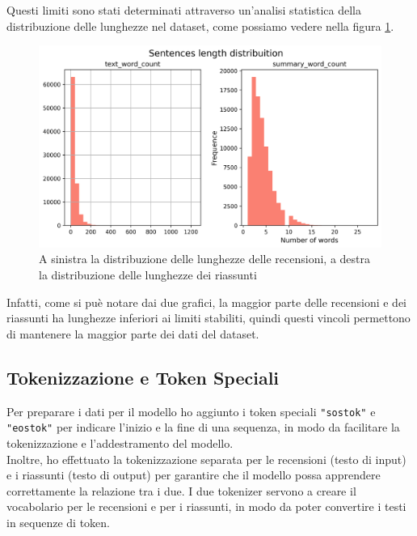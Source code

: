 Questi limiti sono stati determinati attraverso un'analisi statistica della distribuzione delle lunghezze nel dataset, come possiamo vedere nella figura \ref{fig:dataset_length_distribuition}.
\begin{figure}[H]
    \centering
    \includegraphics[width=1\textwidth]{media/dataset_length_distribuition.png}
    \caption{A sinistra la distribuzione delle lunghezze delle recensioni, a destra la distribuzione delle lunghezze dei riassunti}
    \label{fig:dataset_length_distribuition}
\end{figure}
Infatti, come si puè notare dai due grafici, la maggior parte delle recensioni e dei riassunti ha lunghezze inferiori ai limiti stabiliti, quindi questi vincoli permettono di mantenere la maggior parte dei dati del dataset.

\subsection{Tokenizzazione e Token Speciali}
Per preparare i dati per il modello ho aggiunto i token speciali \texttt{"sostok"} e \texttt{"eostok"} per indicare l'inizio e la fine di una sequenza, in modo da facilitare la tokenizzazione e l'addestramento del modello.\\
Inoltre, ho effettuato la tokenizzazione separata per le recensioni (testo di input) e i riassunti (testo di output) per garantire che il modello possa apprendere correttamente la relazione tra i due.
I due tokenizer servono a creare il vocabolario per le recensioni e per i riassunti, in modo da poter convertire i testi in sequenze di token.
